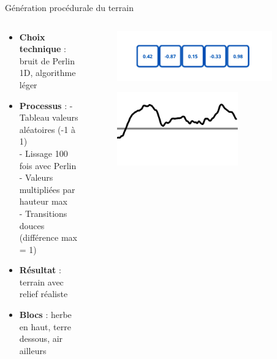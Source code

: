 \documentclass[aspectratio=169]{beamer}
\begin{document}
\begin{frame}{Génération procédurale du terrain}
    \begin{columns}
        \centering
        \begin{column}{0.5\textwidth}
            \centering
            \begin{itemize}
                \item \textbf{Choix technique} : bruit de Perlin 1D, algorithme léger
                \item \textbf{Processus} :
                    - Tableau valeurs aléatoires (-1 à 1)\\
                    - Lissage 100 fois avec Perlin\\
                    - Valeurs multipliées par hauteur max\\
                    - Transitions douces (différence max = 1)
                \item \textbf{Résultat} : terrain avec relief réaliste
                \item \textbf{Blocs} : herbe en haut, terre dessous, air ailleurs\\
            \end{itemize}
        \end{column}
        \begin{column}{0.5\textwidth}
            \centering
            \begin{figure}
                \centering
                \includegraphics[width=0.9\textwidth]{assets/tableau.png}
            \end{figure}
            \begin{figure}
                \centering
                \includegraphics[width=0.7\textwidth]{assets/PerlinNoise1d.png}
            \end{figure}
        \end{column}
    \end{columns}
\end{frame}
\end{document}
